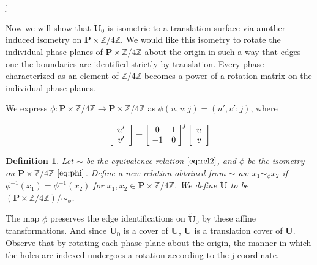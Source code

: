 j\documentclass[]{article}
\newtheorem{Def}{Definition}[subsection]
\begin{document}
 Now we will show that $\tilde{\mathbf{U}}_0$ is isometric to a translation surface via another induced isometry on $\mathbf{P}\times\mathbb{Z}/4\mathbb{Z}$. We would like this isometry to rotate the individual phase planes of $\mathbf{P}\times\mathbb{Z}/4\mathbb{Z}$ about the origin in such a way that edges one the boundaries are identified strictly by translation. Every phase characterized as an element of $\mathbb{Z}/4\mathbb{Z}$ becomes a power of a rotation matrix on the individual phase planes.


We express $\phi:\mathbf{P}\times\mathbb{Z}/4\mathbb{Z} \rightarrow \mathbf{P}\times\mathbb{Z}/4\mathbb{Z}$ as $\phi(u,v;j) = (u',v';j)$, where

\begin{equation}
	\left[\begin{array}{c}
		u'\\v'
	\end{array}\right] =
		\left[ \hspace{1mm} \begin{matrix}
				0 & 1\\
				-1 & 0
			\end{matrix}\hspace{1mm}\right]^{j}\left[\begin{array}{c}
					u\\v
				\end{array}\right]
\label{eq:phi}
\end{equation}



\begin{Def} Let $\sim$ be the equivalence relation $\eqref{eq:rel2}$, and $\phi$ be the isometry on $\mathbf{P}\times\mathbb{Z}/4\mathbb{Z}$ $\eqref{eq:phi}$. Define a new relation obtained from $\sim$ as:  $x_1\sim_{\phi}x_2$ if $\phi^{-1}(x_1) = \phi^{-1}(x_2)$ for $x_1,x_2\in\mathbf{P}\times\mathbb{Z}/4\mathbb{Z}$. We define $\tilde{\mathbf{U}}$ to be  $(\mathbf{P}\times\mathbb{Z}/4\mathbb{Z})/\sim_{\phi}$.\label{eq:simphi}
\end{Def}

The map $\phi$ preserves the edge identifications on $\tilde{\mathbf{U}}_0$ by these affine transformations. And since $\tilde{\mathbf{U}}_0$ is a cover of $\mathbf{U}$, $\tilde{\mathbf{U}}$ is a translation cover of $\mathbf{U}$. Observe that by rotating each phase plane about the origin, the manner in which the holes are indexed undergoes a rotation according to the j-coordinate.

\begin{figure}[H]
\centering

\end{figure}
\end{document}
